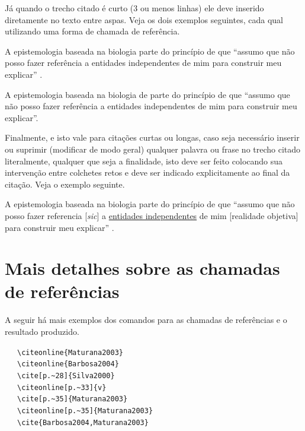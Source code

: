 \begin{apendicesenv}
Já quando o trecho citado é curto (3 ou menos linhas) ele deve inserido diretamente no texto entre aspas. Veja os dois exemplos seguintes, cada qual utilizando uma forma de chamada de referência.

A epistemologia baseada na biologia parte do princípio de que ``assumo que não posso fazer referência a entidades independentes de mim para construir meu explicar'' \cite[p.~35]{Maturana2003}.

A epistemologia baseada na biologia de  parte do princípio de que ``assumo que não posso fazer referência a entidades independentes de mim para construir meu explicar''.

Finalmente, e isto vale para citações curtas ou longas, caso seja necessário inserir ou suprimir (modificar de modo geral) qualquer palavra ou frase no trecho citado literalmente, qualquer que seja a finalidade, isto deve ser feito colocando sua intervenção entre colchetes retos e deve ser indicado explicitamente ao final da citação. Veja o exemplo seguinte.

A epistemologia baseada na biologia parte do princípio de que ``assumo que não posso fazer referencia [\textit{sic}] a \underline{entidades independentes} de mim [realidade objetiva] para construir meu explicar'' \cite[p.~35, comentários e grifo nosso]{Maturana2003}.



\section{Mais detalhes sobre as chamadas de referências}
\label{sec:referUtilizadas}


A seguir há mais exemplos dos comandos para as chamadas de referências e o resultado produzido.


 \ \ \  \verb|\citeonline{Maturana2003}|\\
 \ \ \   \verb|\citeonline{Barbosa2004}|\\
\cite[p.~28]{Silva2000} \ \ \  \verb|\cite[p.~28]{Silva2000}|\\
 \ \ \   \verb|\citeonline[p.~33]{v}|\\
\cite[p.~35]{Maturana2003} \ \ \   \verb|\cite[p.~35]{Maturana2003}|\\
 \ \ \   \verb|\citeonline[p.~35]{Maturana2003}|\\
\cite{Barbosa2004,Maturana2003} \ \ \   \verb|\cite{Barbosa2004,Maturana2003}|\\



\end{apendicesenv}
